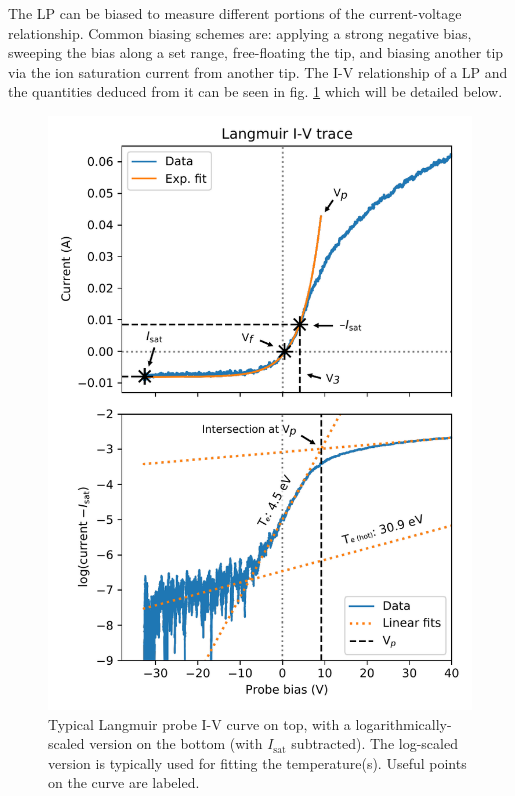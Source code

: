 The LP can be biased to measure different portions of the current-voltage relationship. Common biasing schemes are: applying a strong negative bias, sweeping the bias along a set range, free-floating the tip, and biasing another tip via the ion saturation current  from another tip. The I-V relationship of a LP and the quantities deduced from it can be seen in fig. \ref{fig:langmuir_sweep} which will be detailed below.

\begin{figure}
	\centering
	\includegraphics[height=0.8\textheight]{figures/example_sweep_analysis.pdf}
	\caption[Typical Langmuir probe I-V curve]{\label{fig:langmuir_sweep}Typical Langmuir probe I-V curve on top, with a logarithmically-scaled version on the bottom (with $I_\text{sat}$ subtracted). The log-scaled version is typically used for fitting the temperature(s). Useful points on the curve are labeled.}
\end{figure}


